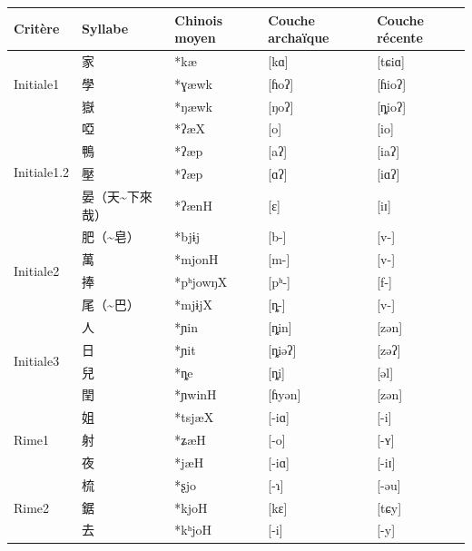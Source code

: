 \documentclass{scrbook}
\newcounter{c}[subsubsection]
\newcommand{\bolang}{\textasciitilde}
\begin{document}
\begin{sloppypar}
\begin{landscape}
\begin{longtable}[htbp]{lllll}
    \toprule
     Critère & Syllabe & Chinois moyen  & Couche archaïque & Couche récente \\
    \midrule
    \multirow{3}[2]{*}{Initiale1} & 家     & *kæ   & [kɑ]  & [tɕiɑ] \\
          & 學     & *ɣæwk & [ɦoʔ] & [ɦioʔ] \\
          & 嶽     & *ŋæwk & [ŋoʔ] & [ȵioʔ] \\
    \midrule
    \multirow{4}[2]{*}{Initiale1.2} & 啞     & *ʔæX  & [o]   & [io] \\
          & 鴨     & *ʔæp  & [aʔ]  & [iaʔ] \\
          & 壓     & *ʔæp  & [ɑʔ]  & [iɑʔ] \\
          & 晏（天\bolang 下來哉） & *ʔænH & [ɛ]   & [iɪ] \\
    \midrule
    \multirow{4}[2]{*}{Initiale2} & 肥（\bolang 皂） & *bjɨj & [b-]  & [v-] \\
          & 萬     & *mjonH & [m-]  & [v-] \\
          & 捧     & *pʰjowŋX & [pʰ-] & [f-] \\
          & 尾（\bolang 巴） & *mjɨjX & [ȵ-]  & [v-] \\
    \midrule
    \multirow{4}[2]{*}{Initiale3} & 人     & *ɲin  & [ȵin] & [zən] \\
          & 日     & *ɲit  & [ȵiəʔ] & [zəʔ] \\
          & 兒     & *ȵe   & [ȵi]  & [əl] \\
          & 閏     & *ɲwinH & [ɦyən] & [zən] \\
    \midrule
    \multirow{3}[2]{*}{Rime1} & 姐     & *tsjæX & [-iɑ] & [-i] \\
          & 射     & *ʑæH  & [-o]  & [-ʏ] \\
          & 夜     & *jæH  & [-iɑ] & [-iɪ] \\
    \midrule
    \multirow{3}[2]{*}{Rime2} & 梳     & *ʂjo  & [-ɿ]  & [-əu] \\
          & 鋸     & *kjoH & [kɛ]  & [tɕy] \\
          & 去     & *kʰjoH & [-i]  & [-y] \\

\end{longtable}
\end{landscape}
\end{sloppypar}
\end{document}
